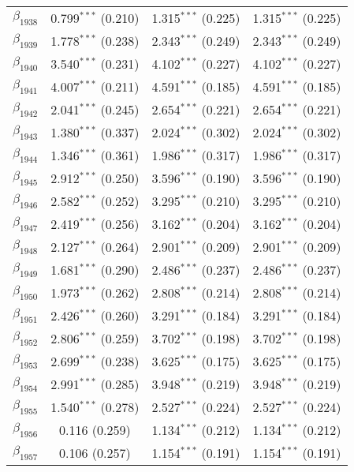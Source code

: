 \begin{table}[!h]
\begin{tabular}{@{\extracolsep{5pt}}lccc}
  $\beta_{1938}$ & 0.799$^{***}$ (0.210) & 1.315$^{***}$ (0.225) & 1.315$^{***}$ (0.225) \\ 
  $\beta_{1939}$ & 1.778$^{***}$ (0.238) & 2.343$^{***}$ (0.249) & 2.343$^{***}$ (0.249) \\ 
  $\beta_{1940}$ & 3.540$^{***}$ (0.231) & 4.102$^{***}$ (0.227) & 4.102$^{***}$ (0.227) \\ 
  $\beta_{1941}$ & 4.007$^{***}$ (0.211) & 4.591$^{***}$ (0.185) & 4.591$^{***}$ (0.185) \\ 
  $\beta_{1942}$ & 2.041$^{***}$ (0.245) & 2.654$^{***}$ (0.221) & 2.654$^{***}$ (0.221) \\ 
  $\beta_{1943}$ & 1.380$^{***}$ (0.337) & 2.024$^{***}$ (0.302) & 2.024$^{***}$ (0.302) \\ 
  $\beta_{1944}$ & 1.346$^{***}$ (0.361) & 1.986$^{***}$ (0.317) & 1.986$^{***}$ (0.317) \\ 
  $\beta_{1945}$ & 2.912$^{***}$ (0.250) & 3.596$^{***}$ (0.190) & 3.596$^{***}$ (0.190) \\ 
  $\beta_{1946}$ & 2.582$^{***}$ (0.252) & 3.295$^{***}$ (0.210) & 3.295$^{***}$ (0.210) \\ 
  $\beta_{1947}$ & 2.419$^{***}$ (0.256) & 3.162$^{***}$ (0.204) & 3.162$^{***}$ (0.204) \\ 
  $\beta_{1948}$ & 2.127$^{***}$ (0.264) & 2.901$^{***}$ (0.209) & 2.901$^{***}$ (0.209) \\ 
  $\beta_{1949}$ & 1.681$^{***}$ (0.290) & 2.486$^{***}$ (0.237) & 2.486$^{***}$ (0.237) \\ 
  $\beta_{1950}$ & 1.973$^{***}$ (0.262) & 2.808$^{***}$ (0.214) & 2.808$^{***}$ (0.214) \\ 
  $\beta_{1951}$ & 2.426$^{***}$ (0.260) & 3.291$^{***}$ (0.184) & 3.291$^{***}$ (0.184) \\ 
  $\beta_{1952}$ & 2.806$^{***}$ (0.259) & 3.702$^{***}$ (0.198) & 3.702$^{***}$ (0.198) \\ 
  $\beta_{1953}$ & 2.699$^{***}$ (0.238) & 3.625$^{***}$ (0.175) & 3.625$^{***}$ (0.175) \\ 
  $\beta_{1954}$ & 2.991$^{***}$ (0.285) & 3.948$^{***}$ (0.219) & 3.948$^{***}$ (0.219) \\ 
  $\beta_{1955}$ & 1.540$^{***}$ (0.278) & 2.527$^{***}$ (0.224) & 2.527$^{***}$ (0.224) \\ 
  $\beta_{1956}$ & 0.116 (0.259) & 1.134$^{***}$ (0.212) & 1.134$^{***}$ (0.212) \\ 
  $\beta_{1957}$ & 0.106 (0.257) & 1.154$^{***}$ (0.191) & 1.154$^{***}$ (0.191) \\ 

\end{tabular}
\end{table}
